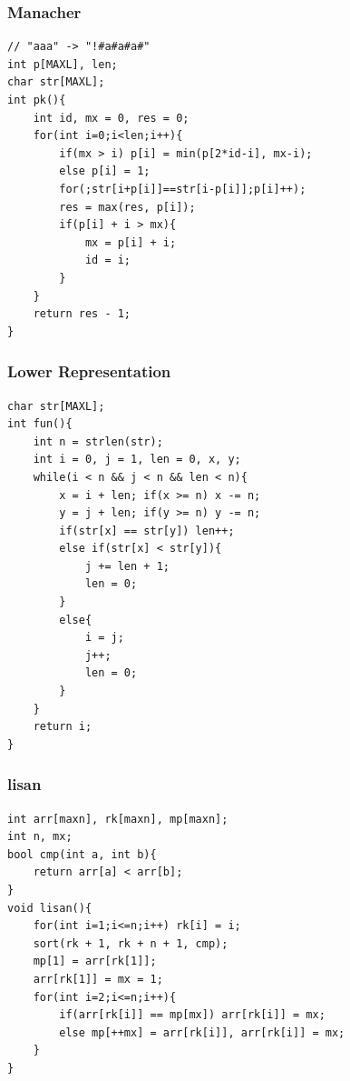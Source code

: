 \documentclass[a4paper]{article}
\begin{document}
\begin{CJK*}{UTF8}{gbsn}
\begin{multicols}{3}
\begin{flushleft}
\subsubsection{Manacher}
\begin{lstlisting}
// "aaa" -> "!#a#a#a#"
int p[MAXL], len;
char str[MAXL];
int pk(){
    int id, mx = 0, res = 0;
    for(int i=0;i<len;i++){
        if(mx > i) p[i] = min(p[2*id-i], mx-i);
        else p[i] = 1;
        for(;str[i+p[i]]==str[i-p[i]];p[i]++);
        res = max(res, p[i]);
        if(p[i] + i > mx){
            mx = p[i] + i;
            id = i;
        }
    }
    return res - 1;
}
\end{lstlisting}

\subsubsection{Lower Representation}
\begin{lstlisting}
char str[MAXL];
int fun(){
    int n = strlen(str);
    int i = 0, j = 1, len = 0, x, y;
    while(i < n && j < n && len < n){
        x = i + len; if(x >= n) x -= n;
        y = j + len; if(y >= n) y -= n;
        if(str[x] == str[y]) len++;
        else if(str[x] < str[y]){
            j += len + 1;
            len = 0;
        }
        else{
            i = j;
            j++;
            len = 0;
        }
    }
    return i;
}
\end{lstlisting}

\subsubsection{lisan}
\begin{lstlisting}
int arr[maxn], rk[maxn], mp[maxn];
int n, mx;
bool cmp(int a, int b){
    return arr[a] < arr[b];
}
void lisan(){
    for(int i=1;i<=n;i++) rk[i] = i;
    sort(rk + 1, rk + n + 1, cmp);
    mp[1] = arr[rk[1]];
    arr[rk[1]] = mx = 1;
    for(int i=2;i<=n;i++){
        if(arr[rk[i]] == mp[mx]) arr[rk[i]] = mx;
        else mp[++mx] = arr[rk[i]], arr[rk[i]] = mx;
    }
}
\end{lstlisting}


\end{flushleft}
\end{multicols}
\end{CJK*}
\end{document}
